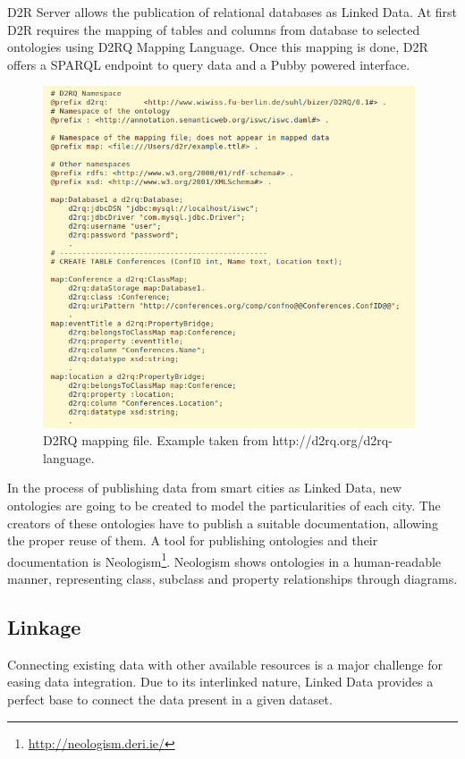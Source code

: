 D2R Server \cite{bizer2006d2r} allows the publication of relational databases as Linked Data. At first D2R requires the mapping of tables and columns from database to selected ontologies using D2RQ Mapping Language. Once this mapping is done, D2R offers a SPARQL endpoint to query data and a Pubby powered interface.

\begin{figure}
    \center
    \includegraphics[width=0.98\textwidth]{img/ld_approach/d2rq.png}
    \caption{D2RQ mapping file. Example taken from http://d2rq.org/d2rq-language.}
    \label{fig:d2rq}
\end{figure}

In the process of publishing data from smart cities as Linked Data, new ontologies are going to be created to model the particularities of each city. The creators of these ontologies have to publish a suitable documentation, allowing the proper reuse of them. A tool for publishing ontologies and their documentation is Neologism\footnote{\url{http://neologism.deri.ie/}}. Neologism shows ontologies in a human-readable manner, representing class, subclass and property relationships through diagrams.

\subsection{Linkage}

Connecting existing data with other available resources is a major challenge for easing data integration. Due to its interlinked nature, Linked Data provides a perfect base to connect the data present in a given dataset.

